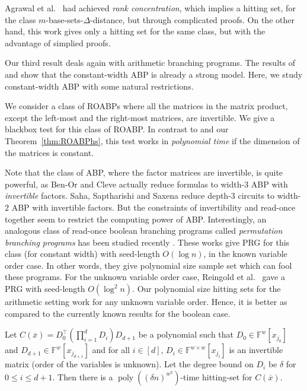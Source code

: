 \documentclass[final,oneeqnum, onethmnum, onefignum]{siamltex1213}
\newcommand{\F}{\mathbb F}
\newcommand{\di}{\Delta} %
\DeclareMathOperator{\poly}{poly}
\renewcommand{\o}[1]{\overline{#1}}
\begin{document}
Agrawal et al.\ \cite{AGKS13} had achieved {\em rank concentration}, which implies
a hitting set, for the class
$m$-base-sets-$\di$-distance, but through complicated proofs.
On the other hand, this work gives only a hitting set
for the same class, but with the advantage of simplied proofs.

Our third result deals again with arithmetic branching programs. 
The results of \cite{BOC92} and \cite{SSS09} show
that the constant-width ABP is already a strong model. 
Here, we study constant-width ABP with some natural restrictions.

We consider a class of ROABPs where all the matrices in the matrix product, except
the left-most and the right-most matrices, are invertible. 
We give a blackbox test for this class of ROABP. 
In contrast to \cite{FSS13} and 
our Theorem~\ref{thm:ROABPhs}, this test works in \emph{polynomial time}
if the dimension of the matrices is constant.

Note that the class of ABP, where the factor matrices are invertible, is quite powerful,
as Ben-Or and Cleve \cite{BOC92} actually reduce formulas to width-$3$ ABP 
with \emph{invertible} factors. 
Saha, Saptharishi and Saxena \cite{SSS09} reduce depth-$3$ circuits to width-$2$ ABP with invertible factors. 
But the constraints of invertibility and read-once together seem
to restrict the computing power of ABP.
Interestingly, an analogous class of read-once boolean branching programs called
{\em permutation branching programs} 
has been studied recently \cite{KNP11, De11, Ste12}.
These works give
PRG for this class (for constant width) with seed-length $O(\log n)$,
in the known variable order case.
In other words, they give polynomial size sample set which can fool these programs.
For the unknown variable order case,
 Reingold et al.\ \cite{RSV13} gave a PRG
with seed-length $O(\log^2 n)$.
Our polynomial size hitting sets for the arithmetic setting work for 
any unknown variable order.
Hence, it is better as compared to the currently known results for the boolean case.

\begin{theorem}
\label{thm:invROABPHS}
Let $C(\o{x}) = D_0^{\top} (\prod_{i=1}^{d} D_i ) D_{d+1}$
be a polynomial such that $D_0 \in \F^w[{x}_{j_0}]$ and $D_{d+1} \in \F^w[{x}_{j_{d+1}}]$
and for all $i \in [d]$, $D_i \in \F^{w \times w}[x_{j_i}]$ is an invertible matrix (order of the variables is unknown).
Let the degree bound on $D_i$ be $\delta$ for $0 \leq i \leq d+1$.
Then there is a $\poly((\delta n)^{w^2})$-time hitting-set for $C(\o{x})$. 
\end{theorem}
\end{document}
